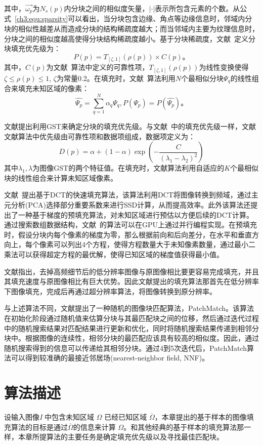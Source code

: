 其中，$\vec{\omega_p}$为$N_s(p)$内分块之间的相似度矢量，$|\cdot|$表示所包含元素的个数。从公式~\ref{ch3:equ:sparsity}可以看出，当分块包含边缘、角点等边缘信息时，邻域内分块的相似性越差从而造成分块的结构稀疏度越大；而当邻域内主要为纹理信息时，分块之间的相似度越高使得分块结构稀疏度越小。基于分块稀疏度，文献~\cite{Xu:2010}定义分块填充优先级为：
$$P(p) = T_{[\zeta,1]}(\rho(p)) \times C(p) 。$$
其中，$C(p)$为文献~算法中定义的可靠性项，$T_{[\zeta,1]}(\rho(p))$为线性变换使得$\zeta \leqslant \rho(p) \leqslant 1$, $\zeta$为常量0.2。在填充时，文献~算法利用$N$个最相似分块$\Psi_q$的线性组合来填充未知区域的像素：
$$\hat{\Psi_p}= \sum_{q=1}^{N}{ \alpha_q \Psi_q}, P(\Psi_p) = P(\hat{\Psi_{p}}) 。$$\par
文献提出利用GST来确定分块的填充优先级。与文献~\cite{Criminisi04regionfilling}中的填充优先级一样，文献文献算法中优先级由可靠性项和数据项组成，数据项定义为：
$$ D(p) = \alpha + (1-\alpha)\exp(-\frac{C}{(\lambda_1 - \lambda_2)^2})$$
其中$\lambda_1,\lambda$为图像GST的两个特征值。在填充时，文献算法利用自适应的$K$个最相似块的线性组合来计算未知区域像素。\par
文献~提出基于DCT的快速填充算法，该算法利用DCT将图像转换到频域，通过主元分析(PCA)选择部分重要系数来进行SSD计算，从而提高效率。此外该算法还提出了一种基于梯度的预填充算法，对未知区域进行预估以方便后续的DCT计算。通过搜索数组数据结构，文献~的算法可以在GPU上通过并行编程实现。在预填充时，假设分块内每个像素的梯度为零，那么根据前向和后向差分，在水平和垂直方向上，每个像素可以列出4个方程，使得方程数量大于未知像素数量，通过最小二乘法可以获得超定方程的最优解，使得已知区域的梯度值获得最小值。 \par
文献指出，去掉高频细节后的低分辨率图像与原图像相比要更容易完成填充，并且其填充速度与原图像相比有巨大优势。因此文献提出的填充算法那首先在低分辨率下图像填充，完成后再通过超分辨率算法，将图像转换到原分辨率。\par
与上述算法不同，文献提出了一种随机的图像块匹配算法，PatchMatch。该算法在初始化阶段通过随机值来估算分块与其最匹配块之间的位移，然后通过迭代过程中的随机搜索结果对匹配结果进行更新和优化，同时将随机搜索结果传递到相邻分块中。根据图像的连续性，相邻分块的最匹配应该具有较高的相似度。因此，通过随机搜索得到的信息可以传递给其相邻分块。通过4到5次迭代后，PatchMatch算法可以得到较准确的最接近邻居场(nearest-neighbor field, NNF)。
 \section{算法描述}
 \label{ch3:sec:algorithm}
 设输入图像\emph{I} 中包含未知区域 \(\Omega\) 已经已知区域 \(\overline{\Omega}\)，本章提出的基于样本的图像填充算法的目标是通过\(\overline{\Omega}\)的信息来计算 \(\Omega\)。和其他经典的基于样本的填充算法那一样，本章所提算法的主要任务是确定填充优先级以及寻找最佳匹配块。

